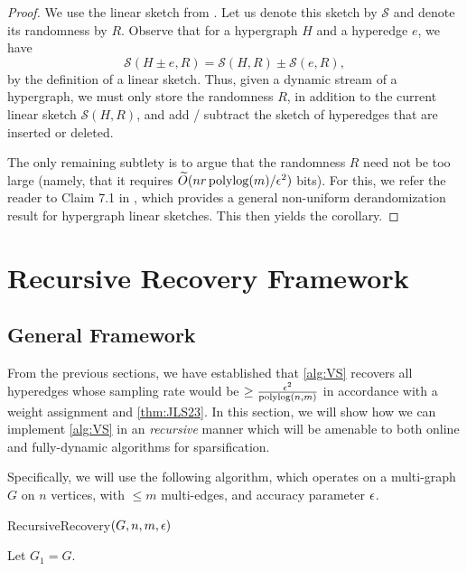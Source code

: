 \documentclass{article}
\begin{document}
\begin{proof}
    We use the linear sketch from . Let us denote this sketch by $\mathcal{S}$ and denote its randomness by $R$. Observe that for a hypergraph $H$ and a hyperedge $e$, we have \[
    \mathcal{S}(H \pm e, R) = \mathcal{S}(H, R)  \pm \mathcal{S}(e, R), 
    \]
    by the definition of a linear sketch. Thus, given a dynamic stream of a hypergraph, we must only store the randomness $R$, in addition to the current linear sketch $\mathcal{S}(H, R)$, and add / subtract the sketch of hyperedges that are inserted or deleted.

    The only remaining subtlety is to argue that the randomness $R$ need not be too large (namely, that it requires $\widetilde{O}(nr \operatorname{polylog}(m) / \epsilon^2)$ bits). For this, we refer the reader to Claim 7.1 in \cite{KPS24c}, which provides a general non-uniform derandomization result for hypergraph linear sketches. This then yields the corollary. 
\end{proof}

\section{Recursive Recovery Framework}
\label{sec:IterativeRecovery}
\subsection{General Framework}

From the previous sections, we have established that \cref{alg:VS} recovers all hyperedges whose sampling rate would be $\geq \frac{\epsilon^2}{\operatorname{polylog}(n,m)}$ in accordance with a weight assignment and \cref{thm:JLS23}. In this section, we will show how we can implement \cref{alg:VS} in an \emph{recursive} manner which will be amenable to both online and fully-dynamic algorithms for sparsification. 

Specifically, we will use the following algorithm, which operates on a multi-graph $G$ on $n$ vertices, with $\leq m$ multi-edges, and accuracy parameter $\epsilon$.

\begin{algorithm}[H]
    \caption{RecursiveRecovery$(G, n, m, \epsilon)$}\label{alg:iterativeRecovery}
    Let $G_1 = G$. \\
\end{algorithm}
\end{document}
